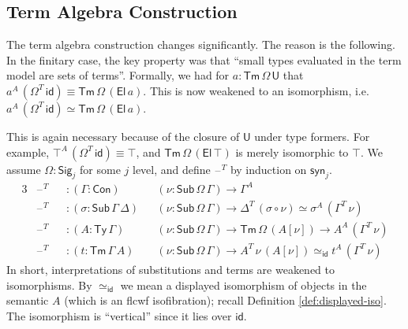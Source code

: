 \documentclass[12pt,a4paper,twoside,openany]{book}
\theoremstyle{remark}
\theoremstyle{definition}
\theoremstyle{theorem}
\newcommand{\id}{\mathsf{id}}
\newcommand{\Con}{\mathsf{Con}}
\newcommand{\Sub}{\mathsf{Sub}}
\newcommand{\Tm}{\mathsf{Tm}}
\newcommand{\Ty}{\mathsf{Ty}}
\newcommand{\U}{\mathsf{U}}
\newcommand{\El}{\mathsf{El}}
\newcommand{\blank}{\mathord{\hspace{1pt}\text{--}\hspace{1pt}}}
\newcommand{\Sig}{\mathsf{Sig}}
\newcommand{\syn}{\mathsf{syn}}
\begin{document}
\subsection{Term Algebra Construction}

The term algebra construction changes significantly. The reason is the
following. In the finitary case, the key property was that ``small types
evaluated in the term model are sets of terms''. Formally, we had for $a :
\Tm\,\Omega\,\U$ that $a^A\,(\Omega^T\,\id) \equiv \Tm\,\Omega\,(\El\,a)$.  This
is now weakened to an isomorphism, i.e.\ $a^A\,(\Omega^T\,\id) \simeq
\Tm\,\Omega\,(\El\,a)$.

This is again necessary because of the closure of $\U$ under type formers. For
example, $\top^A\,(\Omega^T\,\id) \equiv \top$, and $\Tm\,\Omega\,(\El\,\top)$
is merely isomorphic to $\top$. We assume $\Omega : \Sig_j$ for some $j$
level, and define $\blank^T$ by induction on $\syn_j$.
\begin{alignat*}{3}
  &\blank^T &&: (\Gamma : \Con)&&(\nu : \Sub\,\Omega\,\Gamma) \to \Gamma^A\\
  &\blank^T &&: (\sigma : \Sub\,\Gamma\,\Delta)&&(\nu : \Sub\,\Omega\,\Gamma) \to \Delta^T\,(\sigma \circ \nu) \simeq \sigma^A\,(\Gamma^T\,\nu)\\
  &\blank^T &&: (A : \Ty\,\Gamma)&&(\nu : \Sub\,\Omega\,\Gamma) \to \Tm\,\Omega\,(A[\nu])
  \to A^A\,(\Gamma^T\,\nu)\\
  &\blank^T &&: (t : \Tm\,\Gamma\,A)&&(\nu : \Sub\,\Omega\,\Gamma) \to A^T\,\nu\,(A[\nu]) \simeq_{\id} t^A\,(\Gamma^T\,\nu)
\end{alignat*}
In short, interpretations of substitutions and terms are weakened to
isomorphisms.  By $\simeq_{\id}$ we mean a displayed isomorphism of objects in
the semantic $A$ (which is an flcwf isofibration); recall Definition
\ref{def:displayed-iso}.  The isomorphism is ``vertical'' since it lies over
$\id$.
\end{document}
